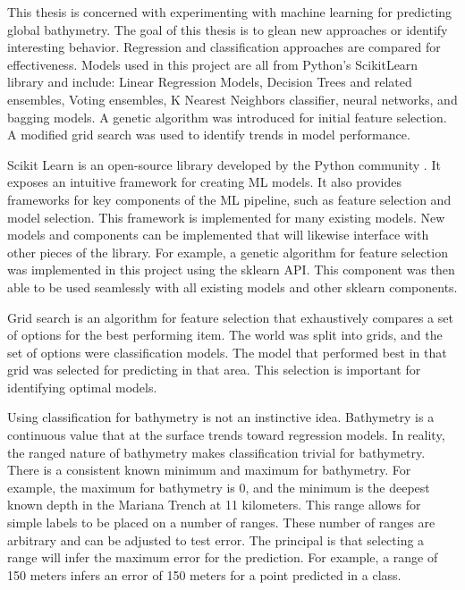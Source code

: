 \par
This thesis is concerned with experimenting with machine learning for predicting global bathymetry.
The goal of this thesis is to glean new approaches or identify interesting behavior.
Regression and classification approaches are compared for effectiveness.
Models used in this project are all from Python's ScikitLearn library and include: Linear Regression Models, Decision Trees and related ensembles, Voting ensembles, K Nearest Neighbors classifier, neural networks, and bagging models.
A genetic algorithm was introduced for initial feature selection.
A modified grid search was used to identify trends in model performance.

\par
Scikit Learn is an open-source library developed by the Python community \cite{scikit-learn}.
It exposes an intuitive framework for creating \ac{ML} models.
It also provides frameworks for key components of the \ac{ML} pipeline, such as feature selection and model selection.
This framework is implemented for many existing models.
New models and components can be implemented that will likewise interface with other pieces of the library.
For example, a genetic algorithm for feature selection was implemented in this project using the sklearn \ac{API}.
This component was then able to be used seamlessly with all existing models and other sklearn components.

\par
Grid search is an algorithm for feature selection that exhaustively compares a set of options for the best performing item.
The world was split into grids, and the set of options were classification models.
The model that performed best in that grid was selected for predicting in that area.
This selection is important for identifying optimal models.


\par
Using classification for bathymetry is not an instinctive idea.
Bathymetry is a continuous value that at the surface trends toward regression models.
In reality, the ranged nature of bathymetry makes classification trivial for bathymetry.
There is a consistent known minimum and maximum for bathymetry.
For example, the maximum for bathymetry is 0, and the minimum is the deepest known depth in the Mariana Trench at 11 kilometers.
This range allows for simple labels to be placed on a number of ranges.
These number of ranges are arbitrary and can be adjusted to test error.
The principal is that selecting a range will infer the maximum error for the prediction.
For example, a range of 150 meters infers an error of 150 meters for a point predicted in a class.




